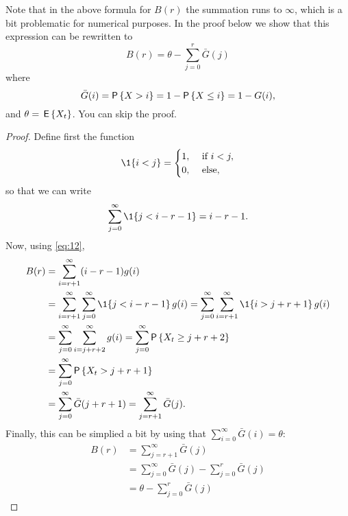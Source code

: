 Note that in the above formula for $B(r)$ the summation runs to $\infty$, which is a bit problematic for numerical purposes. In the proof below we show that this expression can be rewritten to 
\begin{equation}
  \label{eq:17}
   B(r) 
   = \theta - \sum_{j=0}^{r} \bar G(j)
\end{equation}
where
\begin{equation}
  \label{eq:18}
   \bar G(i) = \P{X>i} = 1 - \P{X\leq i} = 1 - G(i),
\end{equation}
and $\theta = \,\mathsf{E}\left\{X_t\right\}$. You can skip the proof. 
\begin{proof}
Define first the function
\begin{equation*}
   \1{i< j} =
     \begin{cases}
       1, &\text{  if } i < j, \\
   0, &\text{ else},
     \end{cases}
\end{equation*}
so that we can write
\begin{equation*}
  \sum_{j=0}^\infty \1{j< i-r - 1} = i-r -1.
\end{equation*}
Now, using \eqref{eq:12},
\begin{equation}
  \label{eq:19}
  \begin{split}
       B(r) &= 
   \sum_{i=r+1}^\infty (i-r-1) g(i)   \\
   &= \sum_{i=r+1}^\infty\sum_{j=0}^\infty \1{j < i-r-1}\, g(i)   = 
    \sum_{j=0}^\infty \sum_{i=r+1}^\infty \1{i > j +r + 1}\, g(i)\\
   &= \sum_{j=0}^\infty \sum_{i=j + r+2}^\infty  g(i) = 
   \sum_{j=0}^\infty \P{X_t \geq j + r+2}  \\
   &=\sum_{j=0}^\infty \P{X_t > j + r+1} \\
   &= \sum_{j=0}^\infty \bar G(j+r+1) =\sum_{j=r+1}^\infty  \bar G(j).
  \end{split}
\end{equation}
Finally, this can be simplied a bit by using that
$\sum_{i=0}^\infty \bar G(i) = \theta$:
\begin{equation}
  \label{eq:119}
  \begin{split}
   B(r) 
   &= \sum_{j=r+1}^\infty  \bar G(j) \\
   &= \sum_{j=0}^\infty  \bar G(j) - \sum_{j=0}^{r} \bar G(j)\\
   &= \theta - \sum_{j=0}^{r} \bar G(j)
  \end{split}
\end{equation}
  
\end{proof}
	   

